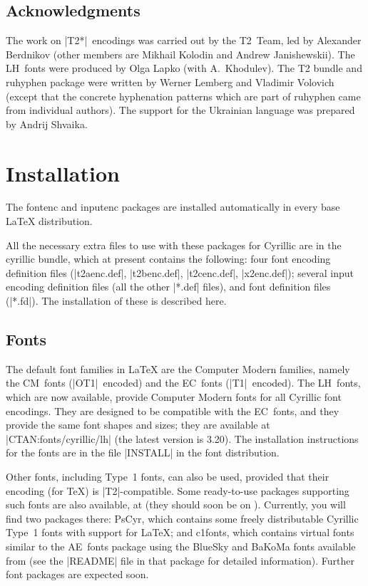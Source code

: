 \documentclass{ltxguide}[1999/02/28]
\begin{document}
\subsection{Acknowledgments}
\label{sec:acks}

The work on |T2*|~encodings was carried out by the T2~Team, led by
Alexander Berdnikov (other members are Mikhail Kolodin and Andrew
Janishewskii).  The LH~fonts were produced by Olga Lapko (with
A.~Khodulev).  The \textsf{T2} bundle and \textsf{ruhyphen} package
were written by Werner Lemberg and Vladimir Volovich (except that the
concrete hyphenation patterns which are part of \textsf{ruhyphen} came
from individual authors).  The support for the Ukrainian language was
prepared by Andrij Shvaika.


\section{Installation}

The \textsf{fontenc} and \textsf{inputenc} packages are installed
automatically in every base \LaTeX{} distribution.

All the necessary extra files to use with these packages for Cyrillic
are in the \textsf{cyrillic} bundle, which at present contains the
following: four font encoding definition files (|t2aenc.def|,
|t2benc.def|, |t2cenc.def|, |x2enc.def|); several input encoding
definition files (all the other |*.def| files), and font definition
files (|*.fd|).
The installation of these is described here.

\subsection{Fonts}

The default font families in \LaTeX{} are the Computer Modern
families, namely the CM~fonts (|OT1|~encoded) and the EC~fonts
(|T1|~encoded).  The LH~fonts, which are now available, provide
Computer Modern fonts for all Cyrillic font encodings.  They are
designed to be compatible with the EC~fonts, and they provide the same
font shapes and sizes; they are available at |CTAN:fonts/cyrillic/lh|
(the latest version is 3.20).  The installation instructions for the
fonts are in the file |INSTALL| in the font distribution.

Other fonts, including Type~1 fonts, can also be used, provided that
their encoding (for \TeX{}) is \mbox{|T2|-compatible}.  Some
ready-to-use packages supporting such fonts are also available, \eg at
 (they should soon be on \ctan).  Currently,
you will find two packages there: \textsf{PsCyr}, which contains some
freely distributable Cyrillic Type~1 fonts with support for \LaTeX{};
and \textsf{c1fonts}, which contains virtual fonts similar to the
\textsf{AE}~fonts package using the BlueSky and BaKoMa fonts
available from \ctan{} (see the |README| file in that package for
detailed information).  Further font packages are expected soon.
\end{document}
